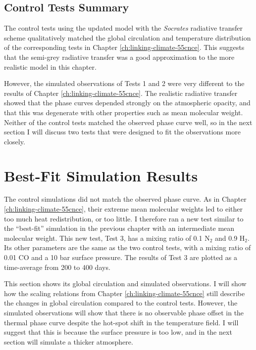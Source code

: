 \subsection{Control Tests Summary}

The control tests using the updated model with the \textit{Socrates} radiative transfer scheme qualitatively matched the global circulation and temperature distribution of the corresponding tests in Chapter \ref{ch:linking-climate-55cnce}. This suggests that the semi-grey radiative transfer was a good approximation to the more realistic model in this chapter.

However, the simulated observations of Tests 1 and 2 were very different to the results of Chapter \ref{ch:linking-climate-55cnce}. The realistic radiative transfer showed that the phase curves depended strongly on the atmospheric opacity, and that this was degenerate with other properties such as mean molecular weight. Neither of the control tests matched the observed phase curve well, so in the next section I will discuss two tests that were designed to fit the observations more closely.




\section{Best-Fit Simulation Results}\label{sec:best-fit-simulation}

The control simulations did not match the observed phase curve. As in Chapter \ref{ch:linking-climate-55cnce}, their extreme mean molecular weights led to either too much heat redistribution, or too little. I therefore ran a new test similar to the ``best-fit'' simulation in the previous chapter with an intermediate mean molecular weight. This new test, Test 3, has a mixing ratio of 0.1 N$_{2}$ and 0.9 H$_{2}$. Its other parameters are the same as the two control tests, with a mixing ratio of 0.01 CO and a 10 bar surface pressure. The results of Test 3 are plotted as a time-average from 200 to 400 days.

This section shows its global circulation and simulated observations. I will show how the scaling relations from Chapter \ref{ch:linking-climate-55cnce} still describe the changes in global circulation compared to the control tests. However, the simulated observations will show that there is no observable phase offset in the thermal phase curve despite the hot-spot shift in the temperature field. I will suggest that this is because the surface pressure is too low, and in the next section will simulate a thicker atmosphere.


